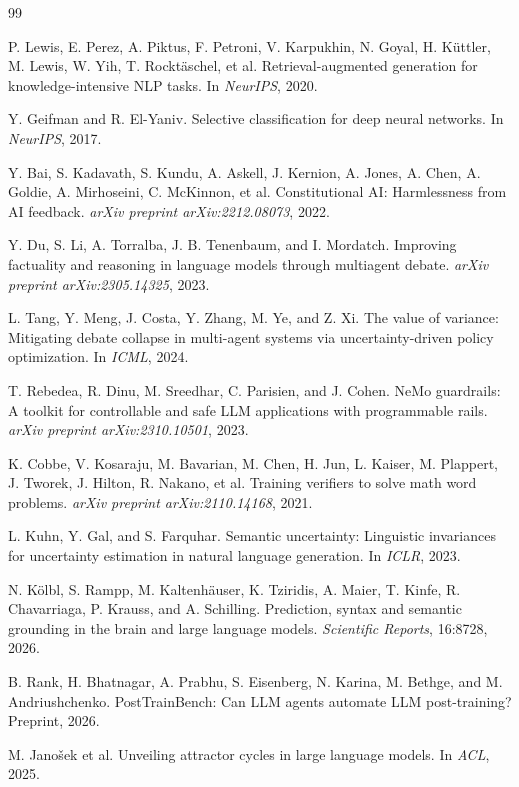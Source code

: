 \documentclass[11pt,a4paper]{article}
\begin{document}
\begin{thebibliography}{99}

P. Lewis, E. Perez, A. Piktus, F. Petroni, V. Karpukhin, N. Goyal, H. K\"{u}ttler,
M. Lewis, W. Yih, T. Rockt\"{a}schel, et al.
Retrieval-augmented generation for knowledge-intensive NLP tasks.
In \textit{NeurIPS}, 2020.

Y. Geifman and R. El-Yaniv.
Selective classification for deep neural networks.
In \textit{NeurIPS}, 2017.

Y. Bai, S. Kadavath, S. Kundu, A. Askell, J. Kernion, A. Jones, A. Chen, A. Goldie,
A. Mirhoseini, C. McKinnon, et al.
Constitutional {AI}: Harmlessness from {AI} feedback.
\textit{arXiv preprint arXiv:2212.08073}, 2022.

Y. Du, S. Li, A. Torralba, J. B. Tenenbaum, and I. Mordatch.
Improving factuality and reasoning in language models through multiagent debate.
\textit{arXiv preprint arXiv:2305.14325}, 2023.

L. Tang, Y. Meng, J. Costa, Y. Zhang, M. Ye, and Z. Xi.
The value of variance: Mitigating debate collapse in multi-agent systems via
uncertainty-driven policy optimization.
In \textit{ICML}, 2024.

T. Rebedea, R. Dinu, M. Sreedhar, C. Parisien, and J. Cohen.
{NeMo} guardrails: A toolkit for controllable and safe {LLM} applications
with programmable rails.
\textit{arXiv preprint arXiv:2310.10501}, 2023.

K. Cobbe, V. Kosaraju, M. Bavarian, M. Chen, H. Jun, L. Kaiser, M. Plappert,
J. Tworek, J. Hilton, R. Nakano, et al.
Training verifiers to solve math word problems.
\textit{arXiv preprint arXiv:2110.14168}, 2021.

L. Kuhn, Y. Gal, and S. Farquhar.
Semantic uncertainty: Linguistic invariances for uncertainty estimation in
natural language generation.
In \textit{ICLR}, 2023.

N. K\"{o}lbl, S. Rampp, M. Kaltenh\"{a}user, K. Tziridis, A. Maier, T. Kinfe,
R. Chavarriaga, P. Krauss, and A. Schilling.
Prediction, syntax and semantic grounding in the brain and large language models.
\textit{Scientific Reports}, 16:8728, 2026.

B. Rank, H. Bhatnagar, A. Prabhu, S. Eisenberg, N. Karina, M. Bethge, and
M. Andriushchenko.
{PostTrainBench}: Can {LLM} agents automate {LLM} post-training?
Preprint, 2026.

M. Jano\v{s}ek et al.
Unveiling attractor cycles in large language models.
In \textit{ACL}, 2025.

\end{thebibliography}
\end{document}
